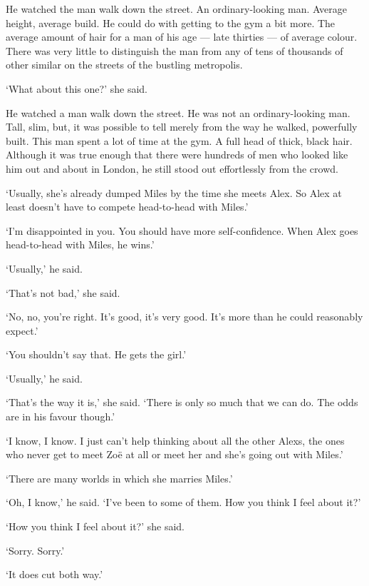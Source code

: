 
\twelverm
He watched the man walk down the street. An ordinary-looking man.
Average height, average build. He could do with getting to the gym a
bit more. The average amount of hair for a man of his age --- late
thirties --- of average colour. There was very little to distinguish
the man from any of tens of thousands of other similar on the
streets of the bustling metropolis.

`What about this one?' she said.

He watched a man walk down the street. He was not an
ordinary-looking man. Tall, slim, but, it was possible to tell
merely from the way he walked, powerfully built. This man spent a lot of
time at the gym. A full head of thick, black hair. Although it was
true enough that there were hundreds of men who looked like him out
and about in London, he still stood out effortlessly from the crowd.

`Usually, she's already dumped Miles by the time she meets Alex. So Alex at least doesn't have to compete head-to-head with
Miles.'

`I'm disappointed in you. You should have more
self-confidence. When Alex goes head-to-head with Miles, he wins.'

`Usually,' he said.

`That's not bad,' she said.

`No, no, you're right. It's good, it's very good. It's more than he
could reasonably expect.'

`You shouldn't say that. He gets the girl.'

`{\twelveit Usually\/},' he said.

`That's the way it is,' she said. `There is only so much that we can do. The odds are in his
favour though.'

`I know, I know. I just can't help thinking about all the other Alexs,
the ones who never get to meet Zoë at all or meet her and she's going
out with Miles.'

`There are many worlds in which she marries Miles.'

`Oh, I know,' he said. `I've been to some of them. How you think I feel about it?'

`How you think {\twelveit I\/} feel about it?' she said.

`Sorry. Sorry.'

`It does cut both way.'

